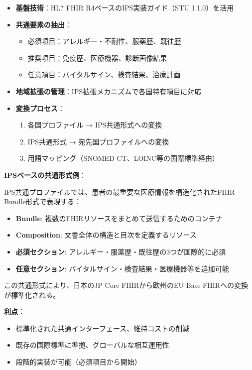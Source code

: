 \documentclass[
  a4paper,
  a4paper,
  11pt]{ltjsbook}
\providecommand{\tightlist}{%
  \setlength{\itemsep}{0pt}\setlength{\parskip}{0pt}}
\begin{document}
\begin{itemize}
\tightlist
\item
  \textbf{基盤技術}：HL7 FHIR R4ベースのIPS実装ガイド（STU 1.1.0）を活用
\item
  \textbf{共通要素の抽出}：

  \begin{itemize}
  \tightlist
  \item
    必須項目：アレルギー・不耐性、服薬歴、既往歴
  \item
    推奨項目：免疫歴、医療機器、診断画像結果
  \item
    任意項目：バイタルサイン、検査結果、治療計画
  \end{itemize}
\item
  \textbf{地域拡張の管理}：IPS拡張メカニズムで各国特有項目に対応
\item
  \textbf{変換プロセス}：

  \begin{enumerate}
  \def\labelenumi{\arabic{enumi}.}
  \tightlist
  \item
    各国プロファイル → IPS共通形式への変換
  \item
    IPS共通形式 → 宛先国プロファイルへの変換
  \item
    用語マッピング（SNOMED CT、LOINC等の国際標準経由）
  \end{enumerate}
\end{itemize}

\textbf{IPSベースの共通形式例}：

IPS共通プロファイルでは、患者の最重要な医療情報を構造化されたFHIR
Bundle形式で表現する：

\begin{itemize}
\tightlist
\item
  \textbf{Bundle}: 複数のFHIRリソースをまとめて送信するためのコンテナ
\item
  \textbf{Composition}: 文書全体の構造と目次を定義するリソース
\item
  \textbf{必須セクション}: アレルギー・服薬歴・既往歴の3つが国際的に必須
\item
  \textbf{任意セクション}:
  バイタルサイン・検査結果・医療機器等を追加可能
\end{itemize}

この共通形式により、日本のJP Core FHIRから欧州のEU Base
FHIRへの変換が標準化される。

\textbf{利点}：

\begin{itemize}
\tightlist
\item
  標準化された共通インターフェース、維持コストの削減
\item
  既存の国際標準に準拠、グローバルな相互運用性
\item
  段階的実装が可能（必須項目から開始）
\end{itemize}
\end{document}
